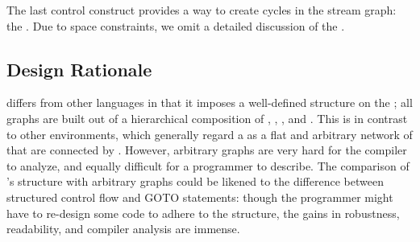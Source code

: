 The last control construct provides a way to create cycles in the
stream graph: the {\feedbackloop}.  Due to space constraints, we
omit a detailed discussion of the {\feedbackloop}.

\subsection{Design Rationale}

{\StreamIt} differs from other \stream languages in that it imposes
a well-defined structure on the \streams; all \stream graphs are
built out of a hierarchical composition of {\filters}, {\pipelines},
{\splitjoins}, and {\feedbackloops}.  This is in contrast to other
environments, which generally regard a \stream as a flat and
arbitrary network of {\filters} that are connected by {\Channels}.
However, arbitrary graphs are very hard for the compiler to
analyze, and equally difficult for a programmer to describe.  The
comparison of {\StreamIt}'s structure with arbitrary \stream graphs
could be likened to the difference between structured control flow
and GOTO statements: though the programmer might have to re-design
some code to adhere to the structure, the gains in robustness,
readability, and compiler analysis are immense.


